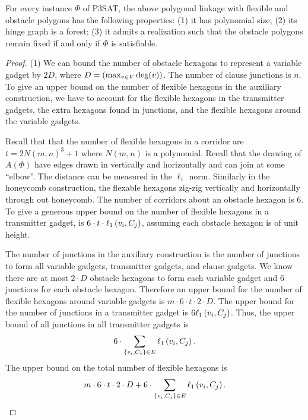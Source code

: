 \begin{lem}\label{lem:aux-A}
For every instance $\Phi$ of P3SAT, the above polygonal linkage with flexible and obstacle polygons has the following properties: (1) it has polynomial size; (2) its hinge graph is a forest;
(3) it admits a realization such that the obstacle polygons remain fixed if and only if $\Phi$ is satisfiable.
\end{lem}
\begin{proof}


\noindent (1) We can bound the number of obstacle hexagons to represent a variable gadget by $2 D$, where $D = \left(  \max_{v \in V} \deg (v) \right)$.  
The number of clause junctions is $n$.
To give an upper bound on the number of flexible hexagons in the auxiliary construction, we have to account for the flexible hexagons in the transmitter gadgets, the extra hexagons found in junctions, and the flexible hexagons around the variable gadgets.

Recall that that the number of flexible hexagons in a corridor are $ t = 2N(m,n)^3 + 1 $ where $N(m,n)$ is a polynomial. 
Recall that the drawing of $A(\Phi)$ have edges drawn in vertically and horizontally and can join at some ``elbow''.  
The distance can be measured in the $\ell_1$ norm.
Similarly in the honeycomb construction, the flexable hexagons zig-zig vertically and horizontally through out honeycomb.  
The number of corridors about an obstacle hexagon is $6$.
To give a generous upper bound on the number of flexible hexagons in a transmitter gadget, is $6 \cdot t \cdot \ell_1\left( v_i,C_j \right)$, assuming each obstacle hexagon is of unit height.

The number of junctions in the auxiliary construction is the number of junctions to form all variable gadgets, transmitter gadgets, and clause gadgets. 
We know there are at most $2 \cdot D$ obstacle hexagons to form each variable gadget and $6$ junctions for each obstacle hexagon.  
Therefore an upper bound for the number of flexible hexagons around variable gadgets is $m \cdot 6 \cdot t \cdot 2 \cdot D$.
The upper bound for the number of junctions in a transmitter gadget is $6 \ell_1 \left( v_i, C_j \right)$.  
Thus, the upper bound of all junctions in all transmitter gadgets is $$6 \cdot \sum_{\left\lbrace v_i, C_j \right\rbrace \in E} \ell_1 \left( v_i, C_j \right).$$
The upper bound on the total number of flexible hexagons is
$$m \cdot 6 \cdot t \cdot 2 \cdot D + 6 \cdot \sum_{\left\lbrace v_i, C_j \right\rbrace \in E} \ell_1 \left( v_i, C_j \right).$$


\end{proof}
